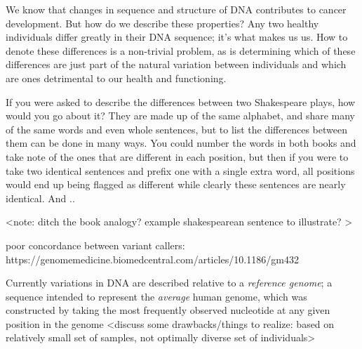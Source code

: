We know that changes in sequence and structure of DNA contributes to cancer development. But how do we describe these properties? Any two healthy individuals differ greatly in their DNA sequence; it's what makes us us. How to denote these differences is a non-trivial problem, as is determining which of these differences are just part of the natural variation between individuals and which are ones detrimental to our health and functioning.

If you were asked to describe the differences between two Shakespeare plays, how would you go about it? They are made up of the same alphabet, and share many of the same words and even whole sentences, but to list the differences between them can be done in many ways. You could number the words in both books and take note of the ones that are different in each position, but then if you were to take two identical sentences and prefix one with a single extra word, all positions would end up being flagged as different while clearly these sentences are nearly identical. And ..

<note: ditch the book analogy? example shakespearean sentence to illustrate? >

poor concordance between variant callers: https://genomemedicine.biomedcentral.com/articles/10.1186/gm432


Currently variations in DNA are described relative to a \emph{reference genome}; a sequence intended to represent the \emph{average} human genome, which was constructed by taking the most frequently observed nucleotide at any given  position in the genome
<discuss some drawbacks/things to realize: based on relatively small set of samples, not optimally diverse set of individuals>

